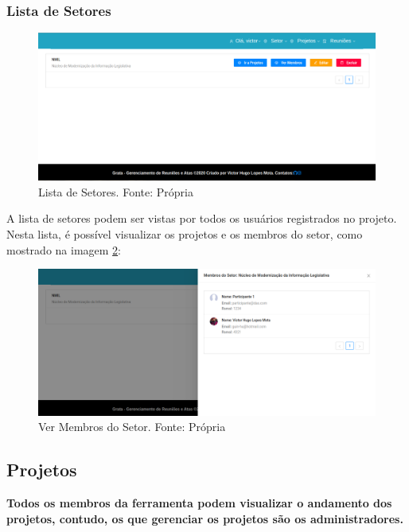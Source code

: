 \subsubsection{Lista de Setores}

\begin{figure}[H]
    \centering
    \includegraphics[width=1.0\textwidth]{figuras/lista_de_setores.png}
    \caption{Lista de Setores. Fonte: Própria}
    \label{img:lista_de_setores}
\end{figure}

A lista de setores podem ser vistas por todos os usuários registrados no projeto. Nesta lista, é possível visualizar os projetos e os membros do setor, como mostrado na imagem \ref{img:ver_membros_setores}:

\begin{figure}[H]
    \centering
    \includegraphics[width=1.0\textwidth]{figuras/membros_setores.png}
    \caption{Ver Membros do Setor. Fonte: Própria}
    \label{img:ver_membros_setores}
\end{figure}

\subsection{Projetos}

\textbf{Todos os membros da ferramenta podem visualizar o andamento dos projetos, contudo, os que gerenciar os projetos são os administradores.}

